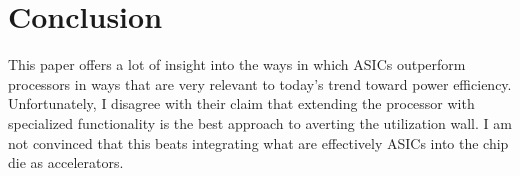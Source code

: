 \documentclass{article}
\begin{document}
\section*{Conclusion}
This paper offers a lot of insight into the ways in which ASICs outperform
processors in ways that are very relevant to today's trend toward power
efficiency. Unfortunately, I disagree with their claim that extending the
processor with specialized functionality is the best approach to averting the
utilization wall. I am not convinced that this beats integrating what are
effectively ASICs into the chip die as accelerators.




\end{document}

